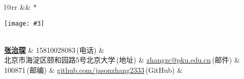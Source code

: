\newcommand{\paint}[3]{
    \begin{minipage}{#1}
        \texttt{[image: \#3]}
    \end{minipage} 
}
\newcommand{\myheader}{
\begin{tabular*}{\textwidth}{l@{\extracolsep{\fill}}rr}
  && \multirow{4}*{\paint{2.6cm}{3.2cm}{./image.jpg}}\\
  \specialrule{0em}{4pt}{4pt}
  \textbf{\href{http://herechen.github.io}{\LARGE 张治琛}} & 15810028083$\,${\color{labelgrey}(电话)} &\\
  北京市海淀区颐和园路5号北京大学$\,${\color{labelgrey}(地址)} & \href{mailto:zhangzc@pku.edu.cn}{zhangzc@pku.edu.cn}$\,${\color{labelgrey}(邮件)} & \\
  100871$\,${\color{labelgrey}(邮编)} & \href{http://github.com/jasonzhang2333}{github.com/jasonzhang2333}$\,${\color{labelgrey}(GitHub)} & \\
  \end{tabular*}\\\vspace{0.1in}
}

\myheader

